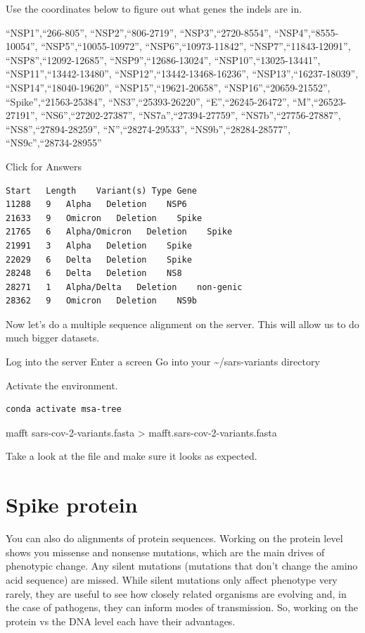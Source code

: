 \documentclass[
]{book}
\begin{document}
Use the coordinates below to figure out what genes the indels are in.

``NSP1'',``266-805'',
``NSP2'',``806-2719'',
``NSP3'',``2720-8554'',
``NSP4'',``8555-10054'',
``NSP5'',``10055-10972'',
``NSP6'',``10973-11842'',
``NSP7'',``11843-12091'',
``NSP8'',``12092-12685'',
``NSP9'',``12686-13024'',
``NSP10'',``13025-13441'',
``NSP11'',``13442-13480'',
``NSP12'',``13442-13468-16236'',
``NSP13'',``16237-18039'',
``NSP14'',``18040-19620'',
``NSP15'',``19621-20658'',
``NSP16'',``20659-21552'',
``Spike'',``21563-25384'',
``NS3'',``25393-26220'',
``E'',``26245-26472'',
``M'',``26523-27191'',
``NS6'',``27202-27387'',
``NS7a'',``27394-27759'',
``NS7b'',``27756-27887'',
``NS8'',``27894-28259'',
``N'',``28274-29533'',
``NS9b'',``28284-28577'',
``NS9c'',``28734-28955''

Click for Answers

\begin{verbatim}
Start   Length    Variant(s) Type Gene
11288   9   Alpha   Deletion    NSP6
21633   9   Omicron   Deletion    Spike
21765   6   Alpha/Omicron   Deletion    Spike
21991   3   Alpha   Deletion    Spike
22029   6   Delta   Deletion    Spike
28248   6   Delta   Deletion    NS8
28271   1   Alpha/Delta   Deletion    non-genic
28362   9   Omicron   Deletion    NS9b
\end{verbatim}

\hfill\break

Now let's do a multiple sequence alignment on the server. This will allow us to do much bigger datasets.

Log into the server
Enter a screen
Go into your \textasciitilde/sars-variants directory

Activate the environment.

\begin{verbatim}
conda activate msa-tree
\end{verbatim}

mafft sars-cov-2-variants.fasta \textgreater{} mafft.sars-cov-2-variants.fasta

Take a look at the file and make sure it looks as expected.

\hypertarget{spike-protein}{%
\section{Spike protein}\label{spike-protein}}

You can also do alignments of protein sequences. Working on the protein level shows you missense and nonsense mutations, which are the main drives of phenotypic change. Any silent mutations (mutations that don't change the amino acid sequence) are missed. While silent mutations only affect phenotype very rarely, they are useful to see how closely related organisms are evolving and, in the case of pathogens, they can inform modes of transmission. So, working on the protein vs the DNA level each have their advantages.
\end{document}
